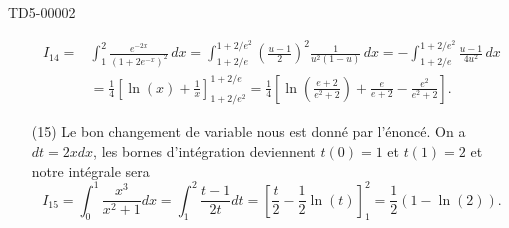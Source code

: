 \begin{corrige}{TD5-00002}
\begin{enumerate}
      \begin{equation*}
        \begin{aligned}
          I_{14}=&\int_1^2\frac{  e^{-2x} }{ (1+2 e^{-x})^2 }\,dx = \int_{1+2/e}^{1+2/e^2}\left(\frac{u-1 }{ 2 }\right)^2\frac{1}{u^2(1-u)}\,dx = -\int_{1+2/e}^{1+2/e^2}\frac{u-1 }{4u^2}\,dx\\
          &= \frac{1}{4}\left[\ln(x)+\frac{1}{x}\right]_{1+2/e^2}^{1+2/e} = \frac{1}{4}\left[\ln\left(\frac{e+2}{e^2+2}\right)+\frac{e}{e+2}-\frac{e^2}{e^2+2}\right].
        \end{aligned}
      \end{equation*}
    \item[(15)]  Le bon changement de variable nous est donné par l'énoncé. On a $ dt= 2xdx$, les bornes d'intégration deviennent $t(0) = 1$ et $t(1) = 2$ et notre intégrale sera 
      \[
      I_{15}=\int_0^1\frac{ x^3 }{ x^2+1 }dx =\int_1^2\frac{ t-1 }{ 2t }dt = \left[\frac{t}{2} -\frac{1}{2}\ln(t)\right]_1^2  = \frac{1}{2}\left(1-\ln(2)\right).
      \]
  \end{enumerate}
\end{corrige}
